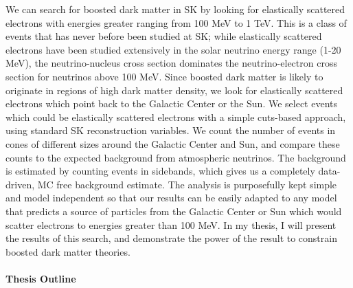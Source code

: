 \documentclass[12pt,oneside,openright]{article}
\begin{document}
We can search for boosted dark matter in SK by looking for elastically scattered electrons with energies greater ranging from 100 MeV to 1 TeV.  This is a class of events that has never before been studied at SK; while elastically scattered electrons have been studied extensively in the solar neutrino energy range (1-20 MeV), the neutrino-nucleus cross section dominates the neutrino-electron cross section for neutrinos above 100 MeV.  Since boosted dark matter is likely to originate in regions of high dark matter density, we look for elastically scattered electrons which point back to the Galactic Center or the Sun.  We select events which could be elastically scattered electrons with a simple cuts-based approach, using standard SK reconstruction variables.  We count the number of events in cones of different sizes around the Galactic Center and Sun, and compare these counts to the expected background from atmospheric neutrinos.  The background is estimated by counting events in sidebands, which gives us a completely data-driven, MC free background estimate.  The analysis is purposefully kept simple and model independent so that our results can be easily adapted to any model that predicts a source of particles from the Galactic Center or Sun which would scatter electrons to energies greater than 100 MeV.  In my thesis, I will present the results of this search, and demonstrate the power of the result to constrain boosted dark matter theories.  
\\
\\
\bf{Thesis Outline}
\end{document}
